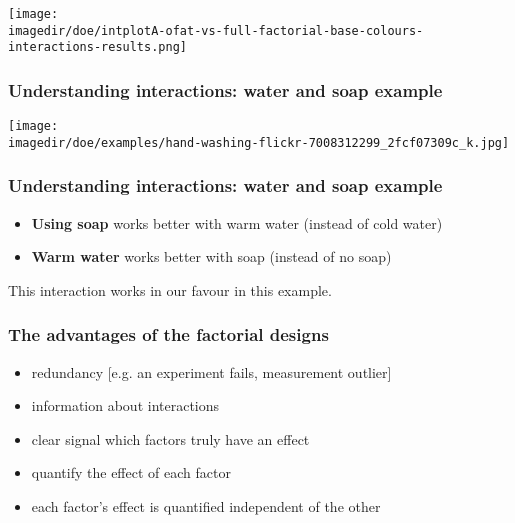 \documentclass[handout,11pt,aspectratio=169,mathserif]{beamer}
\begin{document}
\begin{frame}\frametitle{}
	\centerline{\texttt{[image: \\imagedir/doe/intplotA-ofat-vs-full-factorial-base-colours-interactions-results.png]}}
\end{frame}

\begin{frame}\frametitle{Understanding interactions: water and soap example}
	\begin{center}
		\texttt{[image: \\imagedir/doe/examples/hand-washing-flickr-7008312299\_2fcf07309c\_k.jpg]}
	\end{center}
	\vspace{-4cm}
\end{frame}
\begin{frame}\frametitle{Understanding interactions: water and soap example}
	
	\large
	\begin{itemize}
		\item	\textbf{Using soap} works better with warm water (instead of cold water)

		
		\vspace{24pt}
		\item	\textbf{Warm water} works better with soap (instead of no soap)
			
	\end{itemize}

	\vspace{24pt}
	This interaction works in our favour in this example.
\end{frame}
\begin{frame}\frametitle{The advantages of the factorial designs}
	\begin{itemize}
		\item	redundancy [e.g. an experiment fails, measurement outlier]
		
		\item	information about interactions
		
		\item	clear signal which factors truly have an effect 
		
		\item	quantify the effect of each factor
		
		\item 	each factor's effect is quantified independent of the other
	\end{itemize}
\end{frame}
\end{document}

